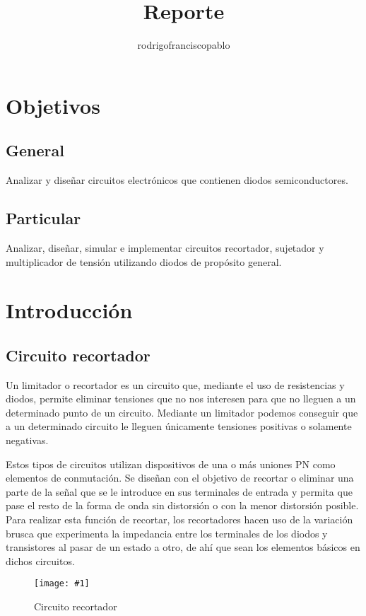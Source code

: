 \documentclass{mylib/reporteConCalif}
\title{Reporte}
\author{rodrigofranciscopablo }
\newcommand{\insertImage}[3]{
	\begin{figure}[H]
		\centering
		\texttt{[image: \#1]}
		\caption{#2}
	\end{figure}
}
\begin{document}
\coverPage


\section{Objetivos}

\subsection{General}

Analizar y diseñar circuitos electrónicos que contienen diodos semiconductores.

\subsection{Particular}

Analizar, diseñar, simular e implementar circuitos recortador, sujetador y multiplicador de tensión utilizando diodos
de propósito general.

\section{Introducción}

\subsection{Circuito recortador}

Un limitador o recortador es un circuito que, mediante el uso de resistencias y diodos, permite eliminar tensiones que no nos interesen para que no lleguen a un determinado punto de un circuito. Mediante un limitador podemos conseguir que a un determinado circuito le lleguen únicamente tensiones positivas o solamente negativas.

Estos tipos de circuitos utilizan dispositivos de una o más uniones PN como elementos de conmutación. Se diseñan con el objetivo de recortar o eliminar una parte de la señal que se le introduce en sus terminales de entrada y permita que pase el resto de la forma de onda sin distorsión o con la menor distorsión posible. Para realizar esta función de recortar, los recortadores hacen uso de la variación brusca que experimenta la impedancia entre los terminales de los diodos y transistores al pasar de un estado a otro, de ahí que sean los elementos básicos en dichos circuitos. 

\insertImage{img/labdisp_pract5/recpos}{Circuito recortador}{8}
	
\end{document}
